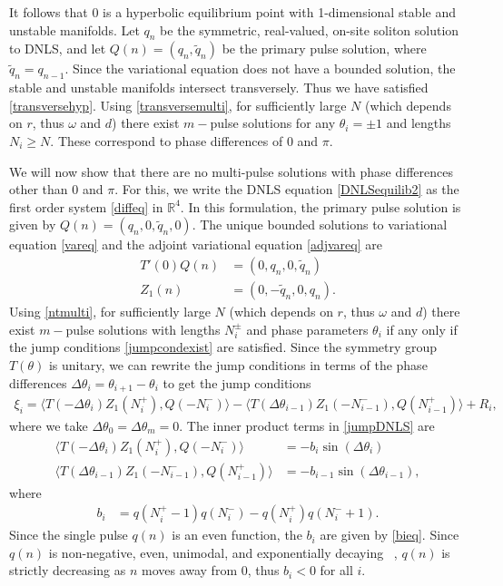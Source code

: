 \documentclass[12pt]{elsarticle}
\def\R{{\mathbb R}}
\begin{document}
It follows that 0 is a hyperbolic equilibrium point with 1-dimensional stable and unstable manifolds. Let $q_n$ be the symmetric, real-valued, on-site soliton solution to DNLS, and let $Q(n) = (q_n, \tilde{q}_n)$ be the primary pulse solution, where $\tilde{q}_n = q_{n-1}$. Since the variational equation does not have a bounded solution, the stable and unstable manifolds intersect transversely. Thus we have satisfied \cref{transversehyp}. Using \cref{transversemulti}, for sufficiently large $N$ (which depends on $r$, thus $\omega$ and $d$) there exist $m-$pulse solutions for any $\theta_i = \pm 1$ and lengths $N_i \geq N$. These correspond to phase differences of $0$ and $\pi$.

We will now show that there are no multi-pulse solutions with phase differences other than $0$ and $\pi$. For this, we write the DNLS equation \cref{DNLSequilib2} as the first order system \cref{diffeq} in $\R^4$. In this formulation, the primary pulse solution is given by $Q(n) = (q_n, 0, \tilde{q}_n, 0)$. The unique bounded solutions to variational equation \cref{vareq} and the adjoint variational equation \cref{adjvareq} are
\begin{align*}
T'(0) Q(n) &= (0, q_n, 0, \tilde{q}_n) \\
Z_1(n) &= (0, -\tilde{q}_n, 0, q_n).
\end{align*}
Using \cref{ntmulti}, for sufficiently large $N$ (which depends on $r$, thus $\omega$ and $d$) there exist $m-$pulse solutions with lengths $N_i^\pm$ and phase parameters $\theta_i$ if any only if the jump conditions \cref{jumpcondexist} are satisfied. Since the symmetry group $T(\theta)$ is unitary, we can rewrite the jump conditions in terms of the phase differences $\Delta \theta_i = \theta_{i+1} - \theta_i$ to get the jump conditions
\begin{align}\label{jumpDNLS}
\xi_i = \langle T(-\Delta \theta_i) Z_1(N_i^+), Q(-N_i^-) \rangle
- \langle T(\Delta \theta_{i-1}) Z_1(-N_{i-1}^-), Q(N_{i-1}^+) \rangle + R_i,
\end{align}
where we take $\Delta \theta_0 = \Delta \theta_m = 0$. The inner product terms in \cref{jumpDNLS} are
\begin{equation}\label{jumpIPs}
\begin{aligned}
\langle T(-\Delta\theta_i) Z_1(N_i^+), Q(-N_i^-) \rangle 
&= -b_i \sin(\Delta\theta_i) \\
\langle T(\Delta\theta_{i-1}) Z_1(-N_{i-1}^-), Q(N_{i-1}^+) \rangle &= -b_{i-1} \sin(\Delta\theta_{i-1}),
\end{aligned}
\end{equation}
where 
\begin{align*}
b_i &= q(N_i^+ - 1)q(N_i^-) - q(N_i^+)q(N_i^- + 1).
\end{align*}
Since the single pulse $q(n)$ is an even function, the $b_i$ are given by \cref{bieq}. Since $q(n)$ is non-negative, even, unimodal, and exponentially decaying ~\cite[Theorem 1]{herrmann_2011}, $q(n)$ is strictly decreasing as $n$ moves away from 0, thus $b_i < 0$ for all $i$. 
\end{document}
